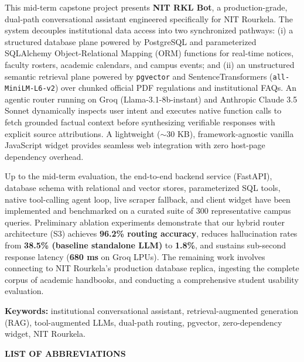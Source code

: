 \documentclass[12pt,a4paper]{report}
\begin{document}
This mid-term capstone project presents \textbf{NIT RKL Bot}, a production-grade, dual-path conversational assistant engineered specifically for NIT Rourkela. The system decouples institutional data access into two synchronized pathways: (i) a structured database plane powered by PostgreSQL and parameterized SQLAlchemy Object-Relational Mapping (ORM) functions for real-time notices, faculty rosters, academic calendars, and campus events; and (ii) an unstructured semantic retrieval plane powered by \texttt{pgvector} and SentenceTransformers (\texttt{all-MiniLM-L6-v2}) over chunked official PDF regulations and institutional FAQs. An agentic router running on Groq (Llama-3.1-8b-instant) and Anthropic Claude 3.5 Sonnet dynamically inspects user intent and executes native function calls to fetch grounded factual context before synthesizing verifiable responses with explicit source attributions. A lightweight ($\sim$30 KB), framework-agnostic vanilla JavaScript widget provides seamless web integration with zero host-page dependency overhead.

Up to the mid-term evaluation, the end-to-end backend service (FastAPI), database schema with relational and vector stores, parameterized SQL tools, native tool-calling agent loop, live scraper fallback, and client widget have been implemented and benchmarked on a curated suite of 300 representative campus queries. Preliminary ablation experiments demonstrate that our hybrid router architecture (S3) achieves \textbf{96.2\% routing accuracy}, reduces hallucination rates from \textbf{38.5\% (baseline standalone LLM)} to \textbf{1.8\%}, and sustains sub-second response latency (\textbf{680 ms} on Groq LPUs). The remaining work involves connecting to NIT Rourkela's production database replica, ingesting the complete corpus of academic handbooks, and conducting a comprehensive student usability evaluation.

\vspace{1.0cm}
\noindent \textbf{Keywords:} institutional conversational assistant, retrieval-augmented generation (RAG), tool-augmented LLMs, dual-path routing, pgvector, zero-dependency widget, NIT Rourkela.

\newpage
\tableofcontents

\newpage
\listoffigures

\newpage
\listoftables

\newpage
\begin{center}
    {\Large \textbf{LIST OF ABBREVIATIONS}}
\end{center}
\vspace{1.0cm}
\end{document}

